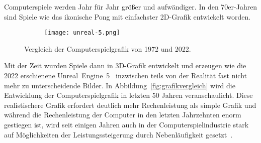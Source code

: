 
Computerspiele werden Jahr für Jahr größer und aufwändiger. In den 70er-Jahren sind Spiele wie das ikonische Pong mit einfachster 2D-Grafik entwickelt worden. 
\begin{figure}
	\begin{subfigure}[b]{.49\textwidth}
		\centering
		\tikzset{external/export next=false}
	\end{subfigure}
	\begin{subfigure}[b]{.49\textwidth}
		\centering
		\texttt{[image: unreal-5.png]}
	\end{subfigure}
	\caption{Vergleich der Computerspielgrafik von 1972 und 2022.}\label{fig:grafikvergleich}
\end{figure}
Mit der Zeit wurden Spiele dann in 3D-Grafik entwickelt und erzeugen wie die 2022 erschienene Unreal~Engine~5~\cite{EpicGamesInc.} inzwischen teils von der Realität fast nicht mehr zu unterscheidende Bilder. In Abbildung~\vref{fig:grafikvergleich} wird die Entwicklung der Computerspielgrafik in letzten 50 Jahren veranschaulicht. Diese realistischere Grafik erfordert deutlich mehr Rechenleistung als simple Grafik und während die Rechenleistung der Computer in den letzten Jahrzehnten enorm gestiegen ist, wird seit einigen Jahren auch in der Computerspielindustrie stark auf Möglichkeiten der Leistungssteigerung durch Nebenläufigkeit gesetzt~\cite{Tatarchuk2014,Genova2015,Gyrling2015,Schott2016,Hodgman2016,White2018}.

